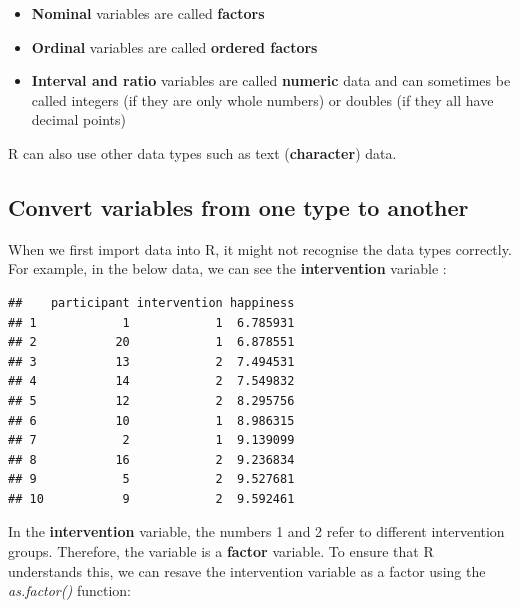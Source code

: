 \documentclass[
]{book}
\newenvironment{Shaded}{\begin{snugshade}}{\end{snugshade}}
\newcommand{\KeywordTok}[1]{\textcolor[rgb]{0.13,0.29,0.53}{\textbf{#1}}}
\newcommand{\NormalTok}[1]{#1}
\newcommand{\OperatorTok}[1]{\textcolor[rgb]{0.81,0.36,0.00}{\textbf{#1}}}
\newcommand{\StringTok}[1]{\textcolor[rgb]{0.31,0.60,0.02}{#1}}
\providecommand{\tightlist}{%
  \setlength{\itemsep}{0pt}\setlength{\parskip}{0pt}}
\begin{document}
\begin{itemize}
\tightlist
\item
  \textbf{Nominal} variables are called \textbf{factors}
\item
  \textbf{Ordinal} variables are called \textbf{ordered factors}
\item
  \textbf{Interval and ratio} variables are called \textbf{numeric} data and can sometimes be called integers (if they are only whole numbers) or doubles (if they all have decimal points)
\end{itemize}

R can also use other data types such as text (\textbf{character}) data.

\hypertarget{convert-variables-from-one-type-to-another}{%
\subsection{Convert variables from one type to another}\label{convert-variables-from-one-type-to-another}}

When we first import data into R, it might not recognise the data types correctly. For example, in the below data, we can see the \textbf{intervention} variable :

\begin{verbatim}
##    participant intervention happiness
## 1            1            1  6.785931
## 2           20            1  6.878551
## 3           13            2  7.494531
## 4           14            2  7.549832
## 5           12            2  8.295756
## 6           10            1  8.986315
## 7            2            1  9.139099
## 8           16            2  9.236834
## 9            5            2  9.527681
## 10           9            2  9.592461
\end{verbatim}

In the \textbf{intervention} variable, the numbers 1 and 2 refer to different intervention groups. Therefore, the variable is a \textbf{factor} variable. To ensure that R understands this, we can resave the intervention variable as a factor using the \emph{as.factor()} function:

\begin{Shaded}
\end{Shaded}
\end{document}
